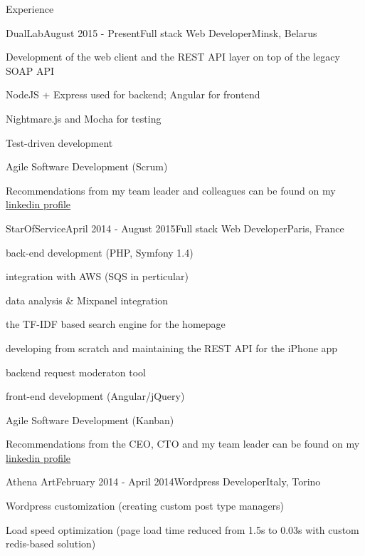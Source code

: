 \documentclass{resume} %
\begin{document}
\begin{rSection}{Experience}

\begin{rSubsection}{DualLab}{August 2015 - Present}{Full stack Web Developer}{Minsk, Belarus}
\item Development of the web client and the REST API layer on top of the legacy SOAP API
\item NodeJS + Express used for backend; Angular for frontend
\item Nightmare.js and Mocha for testing
\item Test-driven development
\item Agile Software Development (Scrum)
\item Recommendations from my team leader and colleagues can be found on my \href{https://www.linkedin.com/pub/alexander-mikhalchenko/84/70b/357}{linkedin profile}
\end{rSubsection}

\clearpage



\begin{rSubsection}{StarOfService}{April 2014 - August 2015}{Full stack Web Developer}{Paris, France}
\item back-end development (PHP, Symfony 1.4)
\item integration with AWS (SQS in perticular)
\item data analysis \& Mixpanel integration
\item the TF-IDF based search engine for the homepage
\item developing from scratch and maintaining the REST API for the iPhone app 
\item backend request moderaton tool
\item front-end development (Angular/jQuery)
\item Agile Software Development (Kanban)
\item Recommendations from the CEO, CTO and my team leader can be found on my \href{https://www.linkedin.com/pub/alexander-mikhalchenko/84/70b/357}{linkedin profile}
\end{rSubsection}


\begin{rSubsection}{Athena Art}{February 2014 - April 2014}{Wordpress Developer}{Italy, Torino}
\item Wordpress customization (creating custom post type managers)
\item Load speed optimization (page load time reduced from 1.5s to 0.03s with custom redis-based solution)
\end{rSubsection}


\end{rSection}
\end{document}
